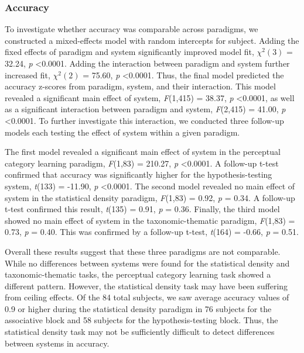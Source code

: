 \documentclass[../dissertation.tex]{subfiles}
\begin{document}
\subsubsection{Accuracy}
To investigate whether accuracy was comparable across paradigms, we constructed a mixed-effects model with random intercepts for subject. Adding the fixed effects of paradigm and system significantly improved model fit, $\chi^{2}(3)$ = 32.24, \textit{p} \textless 0.0001. Adding the interaction between paradigm and system further increased fit, $\chi^{2}(2)$ = 75.60, \textit{p} \textless 0.0001. Thus, the final model predicted the accuracy z-scores from paradigm, system, and their interaction. This model revealed a significant main effect of system, \textit{F}(1,415) = 38.37, \textit{p} \textless 0.0001, as well as a significant interaction between paradigm and system, \textit{F}(2,415) = 41.00, \textit{p} \textless 0.0001. To further investigate this interaction, we conducted three follow-up models each testing the effect of system within a given paradigm. \par
	The first model revealed a significant main effect of system in the perceptual category learning paradigm, \textit{F}(1,83) = 210.27, \textit{p} \textless 0.0001. A follow-up t-test confirmed that accuracy was significantly higher for the hypothesis-testing system, \textit{t}(133) = -11.90, \textit{p} \textless 0.0001. The second model revealed no main effect of system in the statistical density paradigm, \textit{F}(1,83) = 0.92, \textit{p}  = 0.34. A follow-up t-test confirmed this result, \textit{t}(135) = 0.91, \textit{p}  = 0.36.  Finally, the third model showed no main effect of system in the taxonomic-thematic paradigm, \textit{F}(1,83) = 0.73, \textit{p}  = 0.40. This was confirmed by a follow-up t-test, \textit{t}(164) = -0.66, \textit{p}  = 0.51. \par
	Overall these results suggest that these three paradigms are not comparable. While no differences between systems were found for the statistical density and taxonomic-thematic tasks, the perceptual category learning task showed a different pattern. However, the statistical density task may have been suffering from ceiling effects. Of the 84 total subjects, we saw average accuracy values of 0.9 or higher during the statistical density paradigm in 76 subjects for the associative block and 58 subjects for the hypothesis-testing block. Thus, the statistical density task may not be sufficiently difficult to detect differences between systems in accuracy.
 \par
\end{document}

